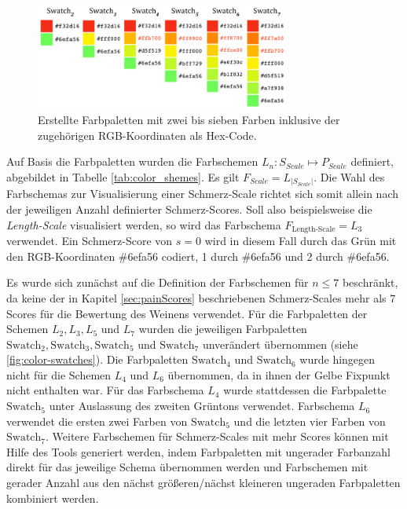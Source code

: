 \begin{figure}[h]
	\centering
	\includegraphics[width=0.75\textwidth]{bilder/colorpics.png}
	\caption[Erstellte Farbpaletten mit zwei bis sieben Farben ]{Erstellte Farbpaletten mit zwei bis sieben Farben inklusive der zugehörigen RGB-Koordinaten als Hex-Code.}
	\label{fig:color-swatches}
\end{figure}

Auf Basis die Farbpaletten wurden die Farbschemen $L_{n}: S_{Scale} \mapsto P_{Scale}$ definiert, abgebildet in Tabelle \ref{tab:color_shemes}. Es gilt $F_{Scale} = L_{|S_{Scale}|}$. Die Wahl des Farbschemas zur Visualisierung einer Schmerz-Scale richtet sich somit allein nach der jeweiligen Anzahl definierter Schmerz-Scores. Soll also beispielsweise die \emph{Length-Scale} visualisiert werden, so wird das Farbschema $F_{\text{Length-Scale}} = L_3$ verwendet. Ein Schmerz-Score von $s = 0$ wird in diesem Fall durch das Grün mit den RGB-Koordinaten \#6efa56 codiert, 1 durch \#6efa56 und 2 durch \#6efa56.

Es wurde sich zunächst auf die Definition der Farbschemen für $n \leq 7$ beschränkt, da keine der in Kapitel \ref{sec:painScores} beschriebenen Schmerz-Scales mehr als 7 Scores für die Bewertung des Weinens verwendet. Für die Farbpaletten der Schemen $L_2, L_3, L_5$ und $L_7$ wurden die jeweiligen Farbpaletten $\text{Swatch}_2, \text{Swatch}_3,\text{Swatch}_5$ und $\text{Swatch}_7$ unverändert übernommen (siehe \autoref{fig:color-swatches}). Die Farbpaletten $\text{Swatch}_4$ und $\text{Swatch}_6$ wurde hingegen nicht für die Schemen $L_4$ und $L_6$ übernommen, da in ihnen der Gelbe Fixpunkt nicht enthalten war. Für das Farbschema $L_4$ wurde stattdessen die Farbpalette $\text{Swatch}_5$ unter Auslassung des zweiten Grüntons verwendet. Farbschema $L_6$ verwendet die ersten zwei Farben von $\text{Swatch}_5$ und die letzten vier Farben von $\text{Swatch}_7$. Weitere Farbschemen für Schmerz-Scales mit mehr Scores können mit Hilfe des Tools generiert werden, indem Farbpaletten mit ungerader Farbanzahl direkt für das jeweilige Schema übernommen werden und Farbschemen mit gerader Anzahl aus den nächst größeren/nächst kleineren ungeraden Farbpaletten kombiniert werden.

